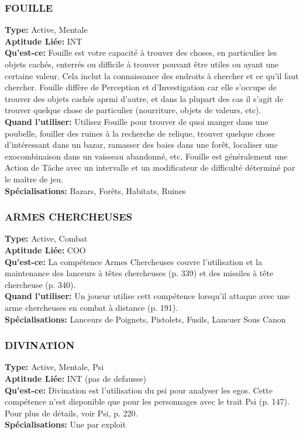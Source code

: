 \subsubsection{FOUILLE} \textbf{Type:} Active, Mentale \\ \textbf{Aptitude Liée:} INT \\ \textbf{Qu'est-ce:} Fouille est votre capacité à trouver des choses, en particulier les objets cachés, enterrés ou difficile à trouver  pouvant être utiles ou ayant une certaine valeur. Cela inclut la connaissance des endroits à chercher et ce qu'il faut chercher. Fouille diffère de Perception et d'Investigation car elle s'occupe de trouver des objets cachés aprmi d'autre, et dans la plupart des cas il s'agit de trouver quelque chose de particulier (nourriture, objets de valeurs, etc). \\ \textbf{Quand l'utiliser:} Utilisez Fouille pour trouver de quoi manger dans une poubelle, fouiller des ruines à la recherche de relique, trouver quelque chose d'intéressant dans un bazar, ramasser des baies dans une forêt, localiser une exocombinaison dans un vaisseau abandonné, etc. Fouille est généralement une Action de Tâche avec un intervalle et un modificateur de difficulté déterminé par le maître de jeu. \\ \textbf{Spécialisations:} Bazars, Forêts, Habitats, Ruines 

\subsubsection{ARMES CHERCHEUSES} \textbf{Type:} Active, Combat \\ \textbf{Aptitude Liée:} COO \\ \textbf{Qu'est-ce:} La compétence Armes Chercheuses couvre l'utilisation et la maintenance des lanceurs à têtes chercheuses  (p. 339) et des missiles à tête chercheuse (p. 340). \\ \textbf{Quand l'utiliser:} Un joueur utilise cett compétence lorsqu'il attaque avec une arme chercheuses en combat à distance (p. 191). \\ \textbf{Spécialisations:} Lanceurs de Poignets, Pistolets, Fusils, Lancuer Sous Canon 

\subsubsection{DIVINATION}
\textbf{Type:} Active, Mentale, Psi \\
\textbf{Aptitude Liée:} INT (pas de defausse)\\
\textbf{Qu'est-ce:} Divination est l'utilisation du psi pour analyser les egos. Cette compétence n'est disponible que pour les personnages avec le trait Psi (p. 147). Pour plus de détails, voir Psi, p. 220. \\
\textbf{Spécialisations:} Une par exploit 

